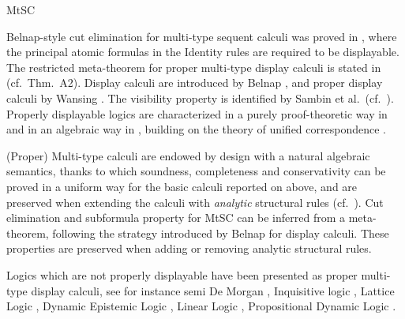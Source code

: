 \begin{entry}{MtSC}
\begin{history}
Belnap-style cut elimination for multi-type sequent calculi was proved in \cite{FrittellaGrecoKurzPalmigianoSikimic2014}, where the principal atomic formulas in the Identity rules are required to be displayable. The restricted meta-theorem for proper multi-type display calculi is stated in \cite[Sec.~A]{GrecoPalmigiano} (cf.~Thm.~A2). Display calculi are introduced by Belnap \cite{Belnap1982}, and proper display calculi by Wansing \cite{Wansing1998}. The visibility property is identified by Sambin et al.~(cf.~\cite{SambinBattilottiFaggian2014}). Properly displayable logics are characterized in a purely proof-theoretic way in \cite{CiabattoniRamanayake2016} and in an algebraic way in \cite{GrecoMaPalmigianoTzimoulisZhao2016}, building on the theory of unified correspondence \cite{ConradieGhilardiPalmigiano2014}.

\end{history}

\begin{technicalities}
(Proper) Multi-type calculi are endowed by design with a natural algebraic semantics, thanks to which soundness, completeness and conservativity can be proved in a uniform way for the basic calculi reported on above, and are preserved when extending the calculi with {\em analytic} structural rules (cf.~\cite[Definition 4]{GrecoMaPalmigianoTzimoulisZhao2016}). 
Cut elimination and subformula property for MtSC can be inferred from a meta-theorem, following the strategy introduced by Belnap for display calculi. These properties are preserved when adding or removing analytic structural rules. 

Logics which are not properly displayable have been presented as proper multi-type display calculi, see for instance semi De Morgan , Inquisitive logic , Lattice Logic , Dynamic Epistemic Logic , Linear Logic , Propositional Dynamic Logic . 


\end{technicalities}

\end{entry}
